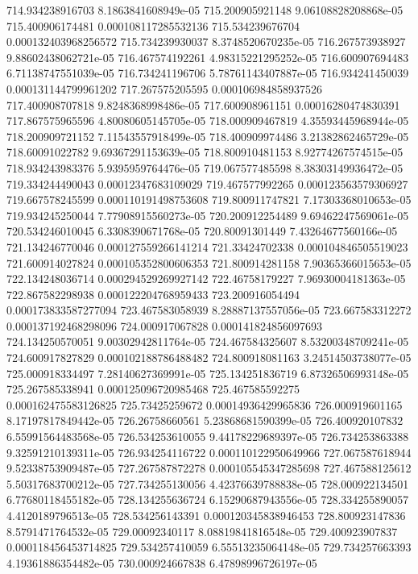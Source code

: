 {714.934238916703 8.1863841608949e-05
715.200905921148 9.06108828208868e-05
715.400906174481 0.000108117285532136
715.534239676704 0.000132403968256572
715.734239930037 8.3748520670235e-05
716.267573938927 9.88602438062721e-05
716.467574192261 4.98315221295252e-05
716.600907694483 6.71138747551039e-05
716.734241196706 5.78761143407887e-05
716.934241450039 0.000131144799961202
717.267575205595 0.000106984858937526
717.400908707818 9.8248368998486e-05
717.600908961151 0.00016280474830391
717.867575965596 4.80080605145705e-05
718.000909467819 4.35593445968944e-05
718.200909721152 7.11543557918499e-05
718.400909974486 3.21382862465729e-05
718.60091022782 9.69367291153639e-05
718.800910481153 8.92774267574515e-05
718.934243983376 5.9395959764476e-05
719.067577485598 8.38303149936472e-05
719.334244490043 0.00012347683109029
719.467577992265 0.000123563579306927
719.667578245599 0.000110191498753608
719.800911747821 7.17303368010653e-05
719.934245250044 7.77908915560273e-05
720.200912254489 9.69462247569061e-05
720.534246010045 6.3308390671768e-05
720.80091301449 7.43264677560166e-05
721.134246770046 0.000127559266141214
721.33424702338 0.000104846505519023
721.600914027824 0.000105352800606353
721.800914281158 7.90365366015653e-05
722.134248036714 0.000294529269927142
722.46758179227 7.96930004181363e-05
722.867582298938 0.000122204768959433
723.200916054494 0.000173833587277094
723.467583058939 8.28887137557056e-05
723.667583312272 0.000137192468298096
724.000917067828 0.000141824856097693
724.134250570051 9.00302942811764e-05
724.467584325607 8.53200348709241e-05
724.600917827829 0.000102188786488482
724.800918081163 3.24514503738077e-05
725.000918334497 7.28140627369991e-05
725.134251836719 6.87326506993148e-05
725.267585338941 0.000125096720985468
725.467585592275 0.000162475583126825
725.73425259672 0.00014936429965836
726.000919601165 8.17197817849442e-05
726.26758660561 5.23868681590399e-05
726.400920107832 6.55991564483568e-05
726.534253610055 9.44178229689397e-05
726.734253863388 9.32591210139311e-05
726.934254116722 0.000110122950649966
727.067587618944 9.52338753909487e-05
727.267587872278 0.000105545347285698
727.467588125612 5.50317683700212e-05
727.734255130056 4.42376639788838e-05
728.000922134501 6.77680118455182e-05
728.134255636724 6.15290687943556e-05
728.334255890057 4.4120189796513e-05
728.534256143391 0.000120345838946453
728.800923147836 8.5791471764532e-05
729.00092340117 8.08819841816548e-05
729.400923907837 0.000118456453714825
729.534257410059 6.55513235064148e-05
729.734257663393 4.19361886354482e-05
730.000924667838 6.47898996726197e-05
}
